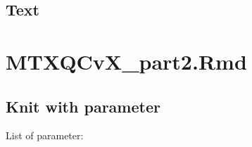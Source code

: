 \documentclass[]{book}
\begin{document}
\hypertarget{text-1}{%
\section{Text}\label{text-1}}

\hypertarget{part2}{%
\chapter{MTXQCvX\_part2.Rmd}\label{part2}}

\hypertarget{knit-with-parameter-3}{%
\section{Knit with parameter}\label{knit-with-parameter-3}}

List of parameter:
\end{document}
